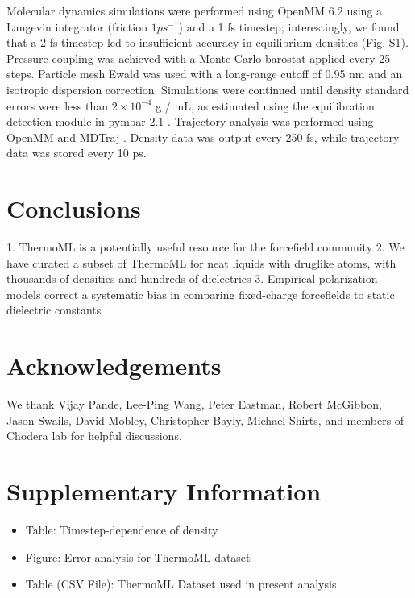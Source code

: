 \documentclass[journal=jacsat,manuscript=article]{achemso}
\begin{document}
Molecular dynamics simulations were performed using OpenMM 6.2 using a Langevin integrator (friction $1 ps^{-1}$) and a 1 fs timestep; interestingly, we found that a 2 fs timestep led to insufficient accuracy in equilibrium densities (Fig. S1).  Pressure coupling was achieved with a Monte Carlo barostat applied every 25 steps.  Particle mesh Ewald \cite{Darden1993} was used with a long-range cutoff of 0.95 nm and an isotropic dispersion correction.  Simulations were continued until density standard errors were less than $2 \times 10^{-4}$ g / mL, as estimated using the equilibration detection module in pymbar 2.1 \cite{shirts2008statistically}.  Trajectory analysis was performed using OpenMM \cite{eastman2012openmm} and MDTraj \cite{mcgibbon2014mdtraj}.  Density data was output every 250 fs, while trajectory data was stored every 10 ps.  

\section{Conclusions}

1.  ThermoML is a potentially useful resource for the forcefield community
2.  We have curated a subset of ThermoML for neat liquids with druglike atoms, with thousands of densities and hundreds of dielectrics
3.  Empirical polarization models correct a systematic bias in comparing fixed-charge forcefields to static dielectric constants


\section{Acknowledgements}

We thank Vijay Pande, Lee-Ping Wang, Peter Eastman, Robert McGibbon, Jason Swails, David Mobley, Christopher Bayly, Michael Shirts, and members of Chodera lab for helpful discussions.  

\section{Supplementary Information}

\begin{itemize}
 \item Table: Timestep-dependence of density
 \item Figure: Error analysis for ThermoML dataset
 \item Table (CSV File): ThermoML Dataset used in present analysis.
\end{itemize}
\end{document}
